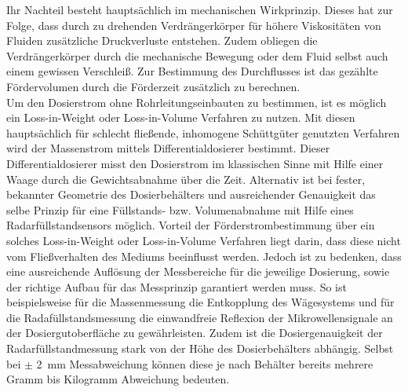 Ihr Nachteil besteht hauptsächlich im mechanischen Wirkprinzip. Dieses hat zur Folge, dass durch zu drehenden Verdrängerkörper für höhere Viskositäten von Fluiden zusätzliche Druckverluste entstehen. Zudem obliegen die Verdrängerkörper durch die mechanische Bewegung oder dem Fluid selbst auch einem gewissen Verschleiß. Zur Bestimmung des Durchflusses ist das gezählte Fördervolumen durch die Förderzeit zusätzlich zu berechnen.\\
Um den Dosierstrom ohne Rohrleitungseinbauten zu bestimmen, ist es möglich ein Loss-in-Weight oder Loss-in-Volume Verfahren zu nutzen. Mit diesen hauptsächlich für schlecht fließende, inhomogene Schüttgüter genutzten Verfahren wird der Massenstrom mittels Differentialdosierer bestimmt. Dieser Differentialdosierer misst den Dosierstrom im klassischen Sinne mit Hilfe einer Waage durch die Gewichtsabnahme über die Zeit. Alternativ ist bei fester, bekannter Geometrie des Dosierbehälters und ausreichender Genauigkeit das selbe Prinzip für eine Füllstands- bzw. Volumenabnahme mit Hilfe eines Radarfüllstandsensors möglich. Vorteil der Förderstrombestimmung über ein solches Loss-in-Weight oder Loss-in-Volume Verfahren liegt darin, dass diese nicht vom Fließverhalten des Mediums beeinflusst werden. Jedoch ist zu bedenken, dass eine ausreichende Auflösung der Messbereiche für die jeweilige Dosierung, sowie der richtige Aufbau für das Messprinzip garantiert werden muss. So ist beispielsweise für die Massenmessung die Entkopplung des Wägesystems und für die Radafüllstandsmessung die einwandfreie Reflexion der Mikrowellensignale an der Dosiergutoberfläche zu gewährleisten. Zudem ist die Dosiergenauigkeit der Radarfüllstandmessung  stark von der Höhe des Dosierbehälters abhängig. Selbst bei $\pm$ \SI{2}{\milli \meter} Messabweichung können diese je nach Behälter bereits mehrere Gramm bis Kilogramm Abweichung bedeuten.\,\cite{Vetter.2002, VEGA.07.02.2022}


%
%



